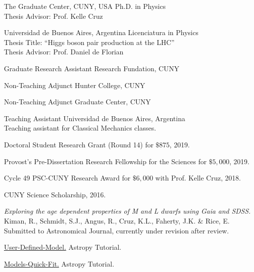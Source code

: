 \documentclass[10pt]{cv}
\begin{document}
\begin{llist}

The Graduate Center, CUNY, USA
Ph.D. in Physics\\
Thesis Advisor: Prof. Kelle Cruz

Universidad de Buenos Aires, Argentina
Licenciatura in Physics\\
Thesis Title: ``Higgs boson pair production at the LHC''\\
Thesis Advisor: Prof. Daniel de Florian


Graduate Research Assistant
Research Fundation, CUNY

Non-Teaching Adjunct
Hunter College, CUNY

Non-Teaching Adjunct
Graduate Center, CUNY

Teaching Assistant
Universidad de Buenos Aires, Argentina\\
Teaching assistant for Classical Mechanics classes.


Doctoral Student Research Grant (Round 14) for $\$875$, 2019.

Provost’s Pre-Dissertation Research Fellowship for the Sciences for $\$5,000$, 2019.

Cycle 49 PSC-CUNY Research Award for $\$6,000$ with Prof. Kelle Cruz, 2018.

CUNY Science Scholarship, 2016.


\textit{Exploring the age dependent properties of M and L dwarfs using \textit{Gaia} and SDSS.} Kiman, R., Schmidt, S.J., Angus, R., Cruz, K.L., Faherty, J.K. \& Rice, E. Submitted to Astronomical Journal, currently under revision after review.

\href{https://github.com/rkiman/astropy-tutorials/blob/user-defined-fitter/tutorials/notebooks/User-Defined-Fitter/User-Defined-Fitter.ipynb}{User-Defined-Model.} Astropy Tutorial.

\href{https://github.com/rkiman/astropy-tutorials/blob/user-defined-fitter/tutorials/notebooks/Models-Quick-Fit/Models-Quick-Fit.ipynb}{Models-Quick-Fit.} Astropy Tutorial.



\end{llist}
\end{document}

